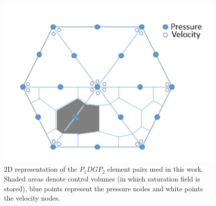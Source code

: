 \documentclass[preprint,authoryear,12pt]{elsarticle}
\begin{document}
\begin{figure}[h]
\centering
\includegraphics[width=.5\textwidth]{./Pics/P1DGP2.pdf}
\caption{2D representation of the $P_{1}DGP_{2}$ element pairs used in this work. Shaded areas denote control volumes (in which saturation field is stored), blue points represent the pressure nodes and white points the velocity nodes.}
\label{fig:fem_cv}
\end{figure}
\end{document}
